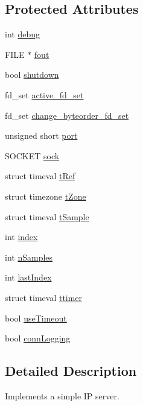 \subsection*{Protected Attributes}
\begin{DoxyCompactItemize}
\item 
int \hyperlink{classBaseServer_a078ea2911e24a247cfec950e13bb78dc}{debug}
\item 
F\-I\-L\-E $\ast$ \hyperlink{classBaseServer_a9ad43261a042fbeeafee33ca4c0b3fd3}{fout}
\item 
bool \hyperlink{classBaseServer_a7d1dd18825bf1ff1c7c7ec0a8903c340}{shutdown}
\item 
fd\-\_\-set \hyperlink{classBaseServer_a9c66924719c4c28d5088dc6359dcf114}{active\-\_\-fd\-\_\-set}
\item 
fd\-\_\-set \hyperlink{classBaseServer_a3e5463a0e428bacd9a23d8f1e03ed943}{change\-\_\-byteorder\-\_\-fd\-\_\-set}
\item 
unsigned short \hyperlink{classBaseServer_a66052c095234e31cada29b678b039c68}{port}
\item 
S\-O\-C\-K\-E\-T \hyperlink{classBaseServer_a8ab6dde541feb79b2315a4fb96918ce6}{sock}
\item 
struct timeval \hyperlink{classBaseServer_a577aa72c0ceda0fb61ae1ebdaca46540}{t\-Ref}
\item 
struct timezone \hyperlink{classBaseServer_a234e5bf97bfbddb110ca8505d16e1ca0}{t\-Zone}
\item 
struct timeval \hyperlink{classBaseServer_a033ccd3b1b9218b8df7c5bac0f16b08e}{t\-Sample}
\item 
int \hyperlink{classBaseServer_a19c0599639c04521eef256b0c3215c5f}{index}
\item 
int \hyperlink{classBaseServer_aa62931fdc3513ffb3e39efb1f1a412b5}{n\-Samples}
\item 
int \hyperlink{classBaseServer_ae6bf1d5aaa70401472f0a355887ab007}{last\-Index}
\item 
struct timeval \hyperlink{classBaseServer_acd804e8f5dbbf12372661674e9efd4a5}{ttimer}
\item 
bool \hyperlink{classBaseServer_a68765146a8e39ba997e3e08ecb23634c}{use\-Timeout}
\item 
bool \hyperlink{classBaseServer_a59d77b9f67ebe2249d592360ba0ebee2}{conn\-Logging}
\end{DoxyCompactItemize}


\subsection{Detailed Description}
Implements a simple I\-P server.

